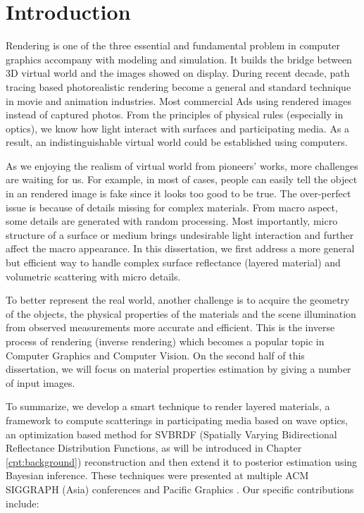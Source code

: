 \chapter{Introduction}
\label{cpt:introduction}

Rendering is one of the three essential and fundamental problem in computer graphics accompany with modeling and simulation. It builds the bridge between 3D virtual world and the images showed on display. During recent decade, path tracing based photorealistic rendering become a general and standard technique in movie and animation industries.  Most commercial Ads using rendered images instead of captured photos. From the principles of physical rules (especially in optics), we know how light interact with surfaces and participating media. As a result, an indistinguishable virtual world could be established using computers.  

As we enjoying the realism of virtual world from pioneers' works, more challenges are waiting for us.  For example, in most of cases, people can easily tell the object in an rendered image is fake since it looks too good to be true. The over-perfect issue is because of details missing for complex materials. From macro aspect, some details are generated with random processing. Most importantly, micro structure of a surface or medium brings undesirable light interaction and further affect the macro appearance.
In this dissertation, we first address a more general but efficient way to handle complex surface reflectance (layered material) and volumetric scattering with micro details.

To better represent the real world, another challenge is to acquire the geometry of the objects, the physical properties of the materials and the scene illumination from observed measurements more accurate and efficient. This is the inverse process of rendering (inverse rendering) which becomes a popular topic in Computer Graphics and Computer Vision. On the second half of this dissertation, we will focus on material properties estimation by giving a number of input images.

To summarize, we develop a smart technique to render layered materials, a framework to compute scatterings in participating media based on wave optics, an optimization based method for SVBRDF (Spatially Varying Bidirectional Reflectance Distribution Functions,
as will be introduced in Chapter \ref{cpt:background}) reconstruction and then extend it to posterior estimation using Bayesian inference.
These techniques were presented at multiple ACM SIGGRAPH (Asia) conferences \cite{guo2018position, guo2021beyond, guo2020materialgan} and Pacific Graphics \cite{guo2020bayesian}. Our specific contributions include:

